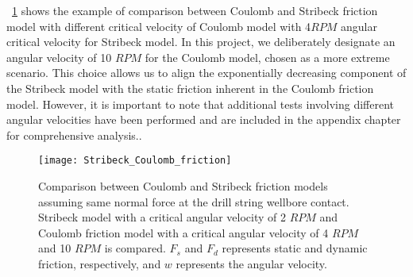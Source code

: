 \figurename~\ref{figure:stribeck_coulomb_friction} shows the example of comparison between Coulomb and Stribeck friction model with different critical velocity of Coulomb model with 4$RPM$ angular critical velocity for Stribeck model. In this project, we deliberately designate an angular velocity of 10 $RPM$ for the Coulomb model, chosen as a more extreme scenario. This choice allows us to align the exponentially decreasing component of the Stribeck model with the static friction inherent in the Coulomb friction model. However, it is important to note that additional tests involving different angular velocities have been performed and are included in the appendix chapter for comprehensive analysis..
\begin{figure}
  \centering
  \texttt{[image: Stribeck\_Coulomb\_friction]}
  \caption[Comparison between Coulomb and Stribeck friction model]{Comparison between Coulomb and Stribeck friction models assuming same normal force at the drill string wellbore contact. Stribeck model with a critical angular velocity of 2 $RPM$ and Coulomb friction model with a critical angular velocity of 4 $RPM$ and 10 $RPM$ is compared. $F_s$ and $F_d$ represents static and dynamic friction, respectively, and $w$ represents the angular velocity.}\label{figure:stribeck_coulomb_friction}
\end{figure}

